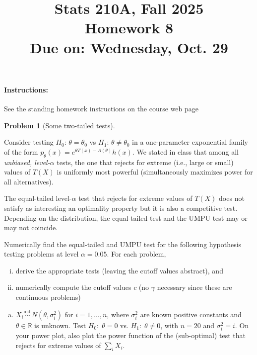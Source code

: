 \documentclass{article}
\newcommand{\RR}{\mathbb{R}}
\newcommand{\simind}{\overset{\text{ind.}}{\sim}}
\theoremstyle{definition}
\newtheorem{problem}{Problem}
\begin{document}
\title{Stats 210A, Fall 2025\\
  Homework 8 \\
  {\large {\bf Due on}: Wednesday, Oct. 29}}
\date{}

\maketitle

\paragraph{Instructions:} See the standing homework instructions on the course web page

\begin{problem}[Some two-tailed tests]
\label{prob:two-tailed}

Consider testing $H_0:\,\theta = \theta_0$ vs $H_1:\,\theta \neq \theta_0$ in a one-parameter exponential family of the form $p_\theta(x) = e^{\theta T(x) - A(\theta)}h(x)$. We stated in class that among all {\em unbiased, level-$\alpha$} tests, the one that rejects for extreme (i.e., large or small) values of $T(X)$ is uniformly most powerful (simultaneously maximizes power for all alternatives).

The equal-tailed level-$\alpha$ test that rejects for extreme values of $T(X)$ does not satisfy as interesting an optimality property but it is also a competitive test. Depending on the distribution, the equal-tailed test and the UMPU test may or may not coincide.

Numerically find the equal-tailed and UMPU test for the following hypothesis testing problems at level $\alpha=0.05$. For each problem,
\begin{enumerate}[(i)]
\item derive the appropriate tests (leaving the cutoff values abstract), and
\item numerically compute the cutoff values $c$ (no $\gamma$ necessary since these are continuous problems)
\end{enumerate}

\begin{enumerate}[(a)]

\item $X_i \simind N(\theta, \sigma_i^2)$ for $i=1,\ldots,n$, where $\sigma_i^2$ are known positive constants and $\theta \in \RR$ is unknown. Test $H_0:\; \theta = 0$ vs. $H_1:\; \theta \neq 0$, with $n = 20$ and $\sigma_i^2 = i$.  On your power plot, also plot the power function of the (sub-optimal) test that rejects for extreme values of $\sum_i X_i$.






\end{enumerate}
\end{problem}
\end{document}
